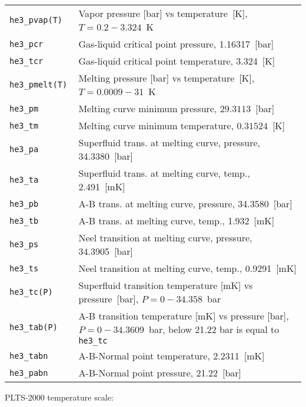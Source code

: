 \documentclass[a4paper]{article}
\begin{document}
\medskip
\noindent\begin{tabular}{lp{11cm}}
\tt he3\_pvap(T)  & Vapor pressure [bar] vs temperature~[K],\newline
                    $ T = 0.2 - 3.324$~K \\
\tt he3\_pcr      & Gas-liquid critical point pressure, 1.16317~[bar] \\
\tt he3\_tcr      & Gas-liquid critical point temperature, 3.324~[K] \\
\tt he3\_pmelt(T) & Melting pressure [bar] vs temperature~[K],\newline
                    $ T = 0.0009 - 31$~K\\
\tt he3\_pm       & Melting curve minimum pressure, $29.3113$~[bar]\\
\tt he3\_tm       & Melting curve minimum temperature, $0.31524$~[K]\\
\tt he3\_pa       & Superfluid trans. at melting curve, pressure, 34.3380~[bar]\\
\tt he3\_ta       & Superfluid trans. at melting curve, temp., 2.491~[mK]\\
\tt he3\_pb       & A-B trans. at melting curve, pressure, 34.3580~[bar]\\
\tt he3\_tb       & A-B trans. at melting curve, temp., 1.932~[mK]\\
\tt he3\_ps       & Neel transition at melting curve, pressure, 34.3905~[bar]\\
\tt he3\_ts       & Neel transition at melting curve, temp., 0.9291~[mK]\\
\tt he3\_tc(P)    & Superfluid transition temperature [mK] vs pressure~[bar],\newline
                    $ P = 0 - 34.358 $~bar\\
\tt he3\_tab(P)   & A-B transition temperature [mK] vs pressure [bar],\newline
                    $ P = 0 - 34.3609 $~bar, below 21.22 bar is equal to {\tt he3\_tc}\\
\tt he3\_tabn     & A-B-Normal point temperature, 2.2311~[mK]\\
\tt he3\_pabn     & A-B-Normal point pressure, 21.22~[bar]\\
\end{tabular}
\medskip

PLTS-2000 temperature scale:
\end{document}
